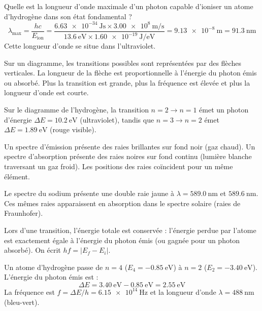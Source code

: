 \begin{exemple}
Quelle est la longueur d'onde maximale d'un photon capable d'ioniser un atome d'hydrogène dans son état fondamental ?
\[
\lambda_{\max} = \frac{h c}{E_{\text{ion}}} = \frac{\SI{6.63e-34}{\joule\second} \times \SI{3.00e8}{\metre\per\second}}{\SI{13.6}{\electronvolt} \times \SI{1.60e-19}{\joule\per\electronvolt}} = \SI{9.13e-8}{\metre} = \SI{91.3}{\nano\metre}
\]
Cette longueur d'onde se situe dans l'ultraviolet.
\end{exemple}

Sur un diagramme, les transitions possibles sont représentées par des flèches verticales. La longueur de la flèche est proportionnelle à l'énergie du photon émis ou absorbé. Plus la transition est grande, plus la fréquence est élevée et plus la longueur d'onde est courte.

\begin{exemple}
Sur le diagramme de l'hydrogène, la transition \(n=2 \to n=1\) émet un photon d'énergie \(\Delta E = \SI{10.2}{\electronvolt}\) (ultraviolet), tandis que \(n=3 \to n=2\) émet \(\Delta E = \SI{1.89}{\electronvolt}\) (rouge visible).
\end{exemple}

Un spectre d'émission présente des raies brillantes sur fond noir (gaz chaud). Un spectre d'absorption présente des raies noires sur fond continu (lumière blanche traversant un gaz froid). Les positions des raies coïncident pour un même élément.

\begin{exemple}
Le spectre du sodium présente une double raie jaune à \(\lambda = \SI{589.0}{\nano\metre}\) et \(\SI{589.6}{\nano\metre}\). Ces mêmes raies apparaissent en absorption dans le spectre solaire (raies de Fraunhofer).
\end{exemple}

Lors d'une transition, l'énergie totale est conservée : l'énergie perdue par l'atome est exactement égale à l'énergie du photon émis (ou gagnée pour un photon absorbé). On écrit \(h f = |E_f - E_i|\).

\begin{exemple}
Un atome d'hydrogène passe de \(n=4\) (\(E_4 = \SI{-0.85}{\electronvolt}\)) à \(n=2\) (\(E_2 = \SI{-3.40}{\electronvolt}\)). L'énergie du photon émis est :
\[
\Delta E = \SI{3.40}{\electronvolt} - \SI{0.85}{\electronvolt} = \SI{2.55}{\electronvolt}
\]
La fréquence est \(f = \Delta E / h = \SI{6.15e14}{\hertz}\) et la longueur d'onde \(\lambda = \SI{488}{\nano\metre}\) (bleu-vert).
\end{exemple}

